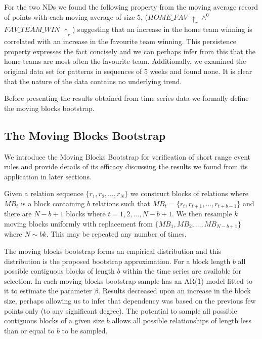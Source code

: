 \medskip

For the two NDs we found the following property from the moving
average record of points with each moving average of size 5,
 ($HOME\_FAV$ $\uparrow_r \wedge^0$ $FAV\_TEAM\_WIN$
$\uparrow_r$) \linebreak[4] suggesting that an
increase in the home team winning is correlated with an increase in
the favourite team winning. This persistence property expresses the fact
concisely and we can perhaps infer from this that the home teams are
most often the favourite team. Additionally, we examined the original
data set for patterns in sequences of 5 weeks and found none. It is
clear that the nature of the data contains no underlying trend.

\medskip

Before presenting the results obtained from time series data we
formally define the moving blocks bootstrap.

\subsection{The Moving Blocks Bootstrap}\label{subsec:tr_mbb}


We introduce the Moving Blocks Bootstrap for verification of short
range event rules and provide details of its efficacy discussing the
results we found from its application in later sections.

\begin{definition}
\begin{rm}
Given a relation sequence \linebreak[4] $\{ r_1, r_2, \ldots, r_N \}$
we construct blocks of relations where $MB_t$ is a block containing
$b$ relations such that $MB_t = \{ r_t, r_{t+1}, \ldots, r_{t+b-1} \}$
and there are $N - b+ 1$ blocks where $t = 1, 2, \ldots, N-b+1$. We
then resample $k$ moving blocks uniformly with replacement from $\{
MB_1, MB_2, \ldots, MB_{N-b+1} \}$ where $N \sim bk$. This may be repeated any number of times.
\end{rm}
\end{definition}

\smallskip

\centerline{}
 
The moving blocks bootstrap forms an empirical distribution and this
distribution is the proposed bootstrap approximation. For a block
length $b$ all possible contiguous blocks of length $b$ within the
time series are available for selection. In \cite{et93} each moving
blocks bootstrap sample has an AR(1) model fitted to it to estimate
the parameter $\beta$. Results decreased upon an increase in the block
size, perhaps allowing us to infer that dependency was based on the
previous few points only (to any significant degree). The potential to
sample all possible contiguous blocks of a given size $b$ allows all
possible relationships of length less than or equal to $b$ to be sampled.



